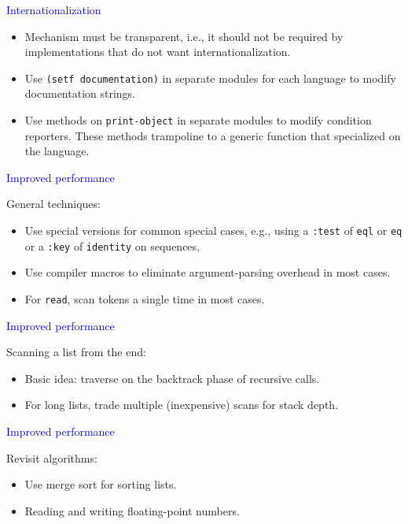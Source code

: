\documentclass{slides}
\newcommand{\ti}[1]{\begin{center}\Large{\textcolor{blue}{#1}}\end{center}}
\begin{document}
\begin{slide}\ti{Internationalization}

\begin{itemize}
\item Mechanism must be transparent, i.e., it should not be required
  by implementations that do not want internationalization. 
\item Use \texttt{(setf documentation)} in separate modules for each
  language to modify documentation strings.
\item Use methods on \texttt{print-object} in separate modules to
  modify condition reporters. These methods trampoline to a generic
  function that specialized on the language. 
\end{itemize}

\vfill\end{slide}
\begin{slide}\ti{Improved performance}

General techniques:

\begin{itemize}
\item Use special versions for common special cases, e.g.,
  using a \texttt{:test} of \texttt{eql} or \texttt{eq} or a
  \texttt{:key} of \texttt{identity} on sequences, 
\item Use compiler macros to eliminate argument-parsing overhead in
  most cases. 
\item For \texttt{read}, scan tokens a single time in most cases. 
\end{itemize}

\vfill\end{slide}
\begin{slide}\ti{Improved performance}

Scanning a list from the end:

\begin{itemize}
\item Basic idea: traverse on the backtrack phase of recursive calls.
\item For long lists, trade multiple (inexpensive) scans for stack
  depth. 
\end{itemize}

\vfill\end{slide}
\begin{slide}\ti{Improved performance}

Revisit algorithms:

\begin{itemize}
\item Use merge sort for sorting lists. 
\item Reading and writing floating-point numbers.
\end{itemize}

\vfill\end{slide}
\end{document}
